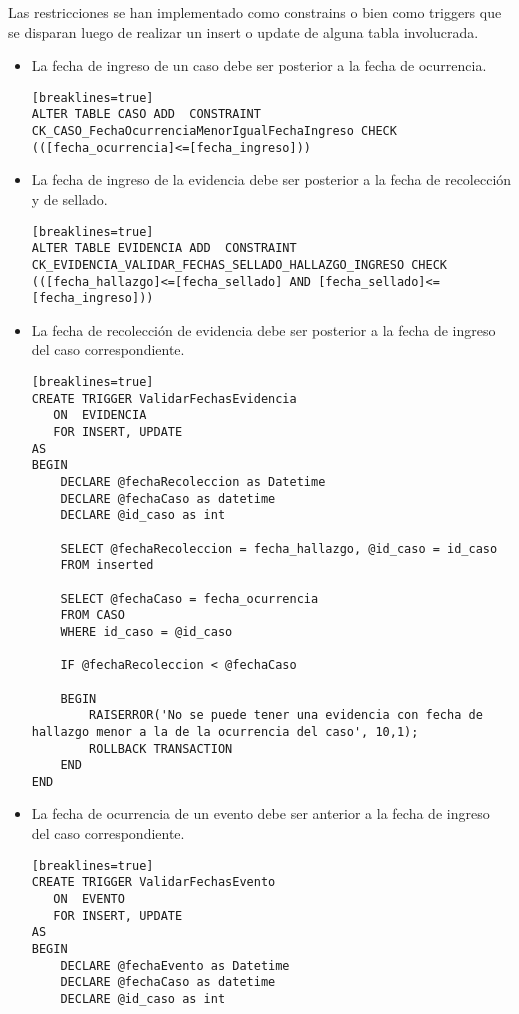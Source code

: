 \noindent Las restricciones se han implementado como constrains o bien como triggers que se disparan luego de realizar un insert o update de alguna tabla involucrada.\\

\begin{itemize}

\item La fecha de ingreso de un caso debe ser posterior a la fecha de ocurrencia.\\
\begin{verbatim}[breaklines=true]
ALTER TABLE CASO ADD  CONSTRAINT CK_CASO_FechaOcurrenciaMenorIgualFechaIngreso CHECK  (([fecha_ocurrencia]<=[fecha_ingreso]))
\end{verbatim}

\item La fecha de ingreso de la evidencia debe ser posterior a la fecha de recolección y de sellado.\\
\begin{verbatim}[breaklines=true]
ALTER TABLE EVIDENCIA ADD  CONSTRAINT CK_EVIDENCIA_VALIDAR_FECHAS_SELLADO_HALLAZGO_INGRESO CHECK  (([fecha_hallazgo]<=[fecha_sellado] AND [fecha_sellado]<=[fecha_ingreso]))
\end{verbatim}

\item La fecha de recolección de evidencia debe ser posterior a la fecha de ingreso del caso correspondiente.\\
\begin{verbatim}[breaklines=true]
CREATE TRIGGER ValidarFechasEvidencia
   ON  EVIDENCIA
   FOR INSERT, UPDATE
AS 
BEGIN	
	DECLARE @fechaRecoleccion as Datetime
	DECLARE @fechaCaso as datetime	
	DECLARE @id_caso as int

    SELECT @fechaRecoleccion = fecha_hallazgo, @id_caso = id_caso
	FROM inserted

	SELECT @fechaCaso = fecha_ocurrencia
	FROM CASO
	WHERE id_caso = @id_caso

	IF @fechaRecoleccion < @fechaCaso

	BEGIN
		RAISERROR('No se puede tener una evidencia con fecha de hallazgo menor a la de la ocurrencia del caso', 10,1);
		ROLLBACK TRANSACTION
	END
END
\end{verbatim}

\item La fecha de ocurrencia de un evento debe ser anterior a la fecha de ingreso del caso correspondiente.\\
\begin{verbatim}[breaklines=true]
CREATE TRIGGER ValidarFechasEvento
   ON  EVENTO
   FOR INSERT, UPDATE
AS 
BEGIN	
	DECLARE @fechaEvento as Datetime
	DECLARE @fechaCaso as datetime	
	DECLARE @id_caso as int


\end{verbatim}
\end{itemize}
